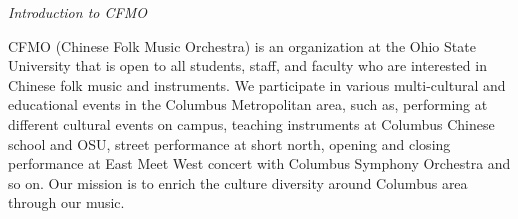 \documentclass[letter,8pt,poets]{ConcProg}
\begin{document}
\begin{spacing}{1.0}
\begin{multicols}{2}
\end{multicols}
\begin{center}
\Large\textsl{ Introduction to CFMO}
\end{center}

CFMO (Chinese Folk Music Orchestra) is an organization at the Ohio State University that is open to all students, staff, and faculty who are interested in Chinese folk music and instruments. We participate in various multi-cultural and educational events in the Columbus Metropolitan area, such as, performing at different cultural events on campus, teaching instruments at Columbus Chinese school and OSU, street performance at short north, opening and closing performance at East Meet West concert with Columbus Symphony Orchestra and so on. Our mission is to enrich the culture diversity around Columbus area through our music.
\end{spacing}
\end{document}
